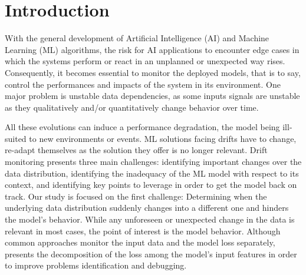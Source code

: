 \documentclass[runningheads]{llncs}
\begin{document}
\section{Introduction}
With the general development of Artificial Intelligence (AI) and Machine Learning (ML) algorithms, the risk for AI applications to encounter edge cases in which the systems perform or react in an unplanned or unexpected way rises. Consequently, it becomes essential to monitor the deployed models, that is to say, control the performances and impacts of the system in its environment.
One major problem is unstable data dependencies, \cite{hiddenTechnicalDebtsinMLSsculley} as some inputs signals are unstable as they qualitatively and/or quantitatively change behavior over time.

All these evolutions can induce a performance degradation, the model being ill-suited to new environments or events. ML solutions facing drifts have to change, re-adapt themselves as the solution they offer is no longer relevant.
Drift monitoring presents three main challenges: identifying important changes over the data distribution, identifying the inadequacy of the ML model with respect to its context, and identifying key points to leverage in order to get the model back on track. Our study is focused on the first challenge: Determining when the underlying data distribution suddenly changes into a different one and hinders the model's behavior. While any unforeseen or unexpected change in the data is relevant in most cases, the point of interest is the model behavior. Although common approaches monitor the input data and the model loss separately, \cite{lundberg2020local2global} presents the decomposition of the loss among the model's input features in order to improve problems identification and debugging.
\end{document}
